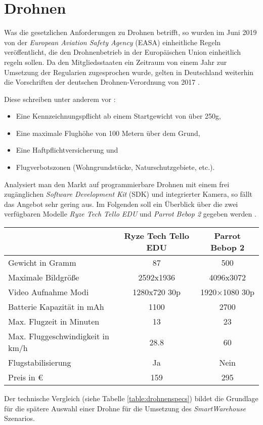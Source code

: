 \section{Drohnen} \label{drohnen}

Was die gesetzlichen Anforderungen zu Drohnen betrifft, so wurden im Juni 2019 von der \textit{European Aviation Safety Agency} (EASA) einheitliche Regeln veröffentlicht, die den Drohnenbetrieb in der Europäischen Union einheitlich regeln sollen. Da den Mitgliedsstaaten ein Zeitraum von einem Jahr zur Umsetzung der Regularien zugesprochen wurde, gelten in Deutschland weiterhin die Vorschriften der deutschen Drohnen-Verordnung von 2017 \cite{EASA.2019}.

Diese schreiben unter anderem vor \cite{Drohnen.de.2020}:
\begin{itemize}
	\item Eine Kennzeichnungspflicht ab einem Startgewicht von über 250g,
	\item Eine maximale Flughöhe von 100 Metern über dem Grund,
	\item Eine Haftpflichtversicherung und
	\item Flugverbotszonen (Wohngrundstücke, Naturschutzgebiete, etc.).
\end{itemize}

Analysiert man den Markt auf programmierbare Drohnen mit einem frei zugänglichen \textit{Software Development Kit} (SDK) und integrierter Kamera, so fällt das Angebot sehr gering aus. Im Folgenden soll ein Überblick über die zwei verfügbaren Modelle \textit{Ryze Tech Tello EDU} und \textit{Parrot Bebop 2} gegeben werden \cite{RyzeRobotics.2020, Parrot.20200520}.

\begin{center}
	\begin{tabular}[H]{l|c|c}
		& Ryze Tech Tello EDU & Parrot Bebop 2\\
		\hline
		Gewicht in Gramm & 87 & 500 \\
		Maximale Bildgröße & 2592x1936 & 4096x3072 \\
		Video Aufnahme Modi & 1280x720 30p & 1920×1080 30p \\
		Batterie Kapazität in mAh & 1100 & 2700 \\
		Max. Flugzeit in Minuten & 13 & 23 \\
		Max. Fluggeschwindigkeit in km/h & 28.8 & 60 \\
		Flugstabilisierung & Ja & Nein \\
		Preis in € & 159 & 295
	\end{tabular}
	\label{table:drohnenspecs}
\end{center}

Der technische Vergleich (siehe Tabelle \ref{table:drohnenspecs}) bildet die Grundlage für die spätere Auswahl einer Drohne für die Umsetzung des \textit{SmartWarehouse} Szenarios.